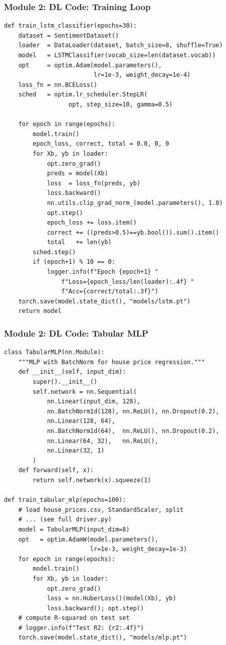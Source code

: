\begin{frame}[fragile]\frametitle{Module 2: DL Code: Training Loop}
\begin{lstlisting}
def train_lstm_classifier(epochs=30):
    dataset = SentimentDataset()
    loader  = DataLoader(dataset, batch_size=8, shuffle=True)
    model   = LSTMClassifier(vocab_size=len(dataset.vocab))
    opt     = optim.Adam(model.parameters(),
                         lr=1e-3, weight_decay=1e-4)
    loss_fn = nn.BCELoss()
    sched   = optim.lr_scheduler.StepLR(
                  opt, step_size=10, gamma=0.5)

    for epoch in range(epochs):
        model.train()
        epoch_loss, correct, total = 0.0, 0, 0
        for Xb, yb in loader:
            opt.zero_grad()
            preds = model(Xb)
            loss  = loss_fn(preds, yb)
            loss.backward()
            nn.utils.clip_grad_norm_(model.parameters(), 1.0)
            opt.step()
            epoch_loss += loss.item()
            correct += ((preds>0.5)==yb.bool()).sum().item()
            total   += len(yb)
        sched.step()
        if (epoch+1) % 10 == 0:
            logger.info(f"Epoch {epoch+1} "
                f"Loss={epoch_loss/len(loader):.4f} "
                f"Acc={correct/total:.3f}")
    torch.save(model.state_dict(), "models/lstm.pt")
    return model
\end{lstlisting}
\end{frame}

\begin{frame}[fragile]\frametitle{Module 2: DL Code: Tabular MLP}
\begin{lstlisting}
class TabularMLP(nn.Module):
    """MLP with BatchNorm for house price regression."""
    def __init__(self, input_dim):
        super().__init__()
        self.network = nn.Sequential(
            nn.Linear(input_dim, 128),
            nn.BatchNorm1d(128), nn.ReLU(), nn.Dropout(0.2),
            nn.Linear(128, 64),
            nn.BatchNorm1d(64),  nn.ReLU(), nn.Dropout(0.2),
            nn.Linear(64, 32),   nn.ReLU(),
            nn.Linear(32, 1)
        )
    def forward(self, x):
        return self.network(x).squeeze(1)

def train_tabular_mlp(epochs=100):
    # load house_prices.csv, StandardScaler, split
    # ... (see full driver.py)
    model = TabularMLP(input_dim=8)
    opt   = optim.AdamW(model.parameters(),
                        lr=1e-3, weight_decay=1e-3)
    for epoch in range(epochs):
        model.train()
        for Xb, yb in loader:
            opt.zero_grad()
            loss = nn.HuberLoss()(model(Xb), yb)
            loss.backward(); opt.step()
    # compute R-squared on test set
    # logger.info(f"Test R2: {r2:.4f}")
    torch.save(model.state_dict(), "models/mlp.pt")
\end{lstlisting}
\end{frame}

